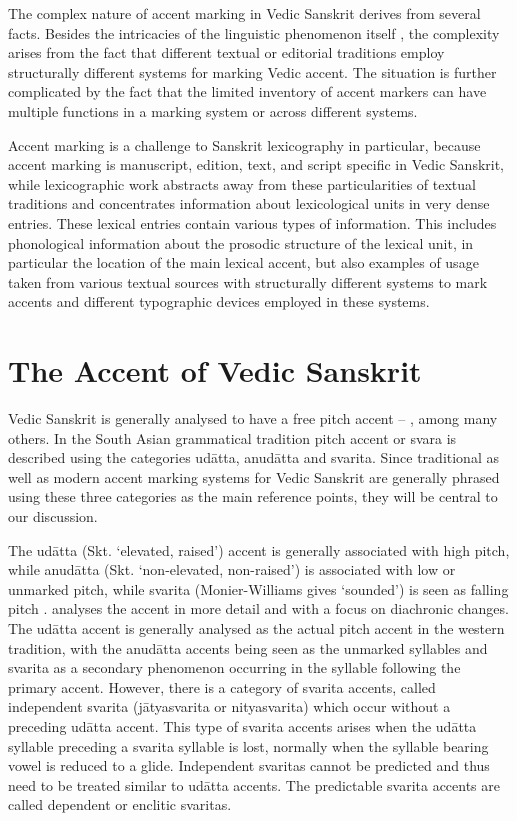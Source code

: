 The complex nature of accent marking in Vedic Sanskrit derives from several facts. Besides the intricacies of the linguistic phenomenon itself \citep[see][among others]{Kiparsky1973}, the complexity arises from the fact that different textual or editorial traditions employ structurally different systems for marking Vedic accent. The situation is further complicated by the fact that the limited inventory of accent markers can have multiple functions in a marking system or across different systems.

Accent marking is a challenge to Sanskrit lexicography in particular, because accent marking is manu\-script, edition, text, and script specific in Vedic Sanskrit, while lexicographic work abstracts away from these particularities of textual traditions and concentrates information about lexicological units in very dense entries. These lexical entries contain various types of information. This includes phonological information about the prosodic structure of the lexical unit, in particular the location of the main lexical accent, but also examples of usage taken from various textual sources with structurally different systems to mark accents and different typographic devices employed in these systems.

\section{The Accent of Vedic Sanskrit}

Vedic Sanskrit is generally analysed to have a free pitch accent – \citet{Kiparsky1973}, \citet{Lubotsky1988} among many others. In the South Asian grammatical tradition pitch accent or svara is described using the categories udātta, anudātta and svarita. Since traditional as well as modern accent marking systems for Vedic Sanskrit are generally phrased using these three categories as the main reference points, they will be central to our discussion.

The udātta (Skt. ‘elevated, raised’) accent is generally associated with high pitch, while anudātta (Skt. ‘non-elevated, non-raised’) is associated with low or unmarked pitch, while svarita (Monier-Williams gives ‘sounded’) is seen as falling pitch \citep[p.~27]{Whitney1869}. \citet{Kiparsky1973} analyses the accent in more detail and with a focus on diachronic changes. The udātta accent is generally analysed as the actual pitch accent in the western tradition, with the anudātta accents being seen as the unmarked syllables and svarita as a secondary phenomenon occurring in the syllable following the primary accent. However, there is a category of svarita accents, called independent svarita (jātyasvarita or nityasvarita) which occur without a preceding udātta accent. This type of svarita accents arises when the udātta syllable preceding a svarita syllable is lost, normally when the syllable bearing vowel is reduced to a glide. Independent svaritas cannot be predicted and thus need to be treated similar to udātta accents. The predictable svarita accents are called dependent or enclitic svaritas.

